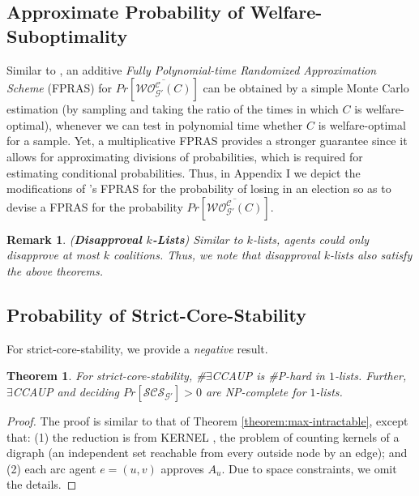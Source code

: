 \documentclass[letterpaper]{article}
\newtheorem{theorem}{Theorem}
\newtheorem{remark}{Remark}
\begin{document}
\subsection{Approximate Probability of Welfare-Suboptimality}
\label{sec:Probability of Welfare-Suboptimality}

Similar to \cite{imber2021probabilistic}, an additive \textit{Fully Polynomial-time Randomized Approximation Scheme} (FPRAS) \cite{karger1995randomized} for $Pr[\overline{\mathcal{WO}^{\mathcal{C}}_{\mathcal{G}'}(C)}]$ can be obtained by a simple Monte Carlo estimation (by sampling and taking the ratio of the times in which $C$ is welfare-optimal), whenever we can test in polynomial time whether $C$ is welfare-optimal for a sample. Yet, a multiplicative FPRAS provides a stronger guarantee since it allows for approximating divisions of probabilities, which is required for estimating conditional probabilities. Thus, in Appendix I we depict the modifications of \cite{imber2021probabilistic}'s FPRAS for the probability of losing in an election so as to devise a FPRAS for the probability $Pr[\overline{\mathcal{WO}^{\mathcal{C}}_{\mathcal{G}'}(C)}]$.


\begin{remark}
{\normalfont (\textbf{Disapproval $k$-Lists})} Similar to $k$-lists, agents could only {\normalfont disapprove} at most $k$ coalitions. Thus, we note that {\normalfont disapproval} $k$-lists also satisfy the above theorems.
\end{remark}

\subsection{Probability of Strict-Core-Stability}
\label{sec:Probability of Strict-Core-Stablity}
For strict-core-stability, we provide a \textit{negative} result.
\begin{theorem}
\label{theorem:strict-core-stable}
For strict-core-stability, \#$\exists$CCAUP is \#P-hard in $1$-lists. Further, $\exists$CCAUP and deciding $Pr[\mathcal{SCS}_{\mathcal{G}'}]>0$ are NP-complete for $1$-lists.
\end{theorem}
\begin{proof}
The proof is similar to that of Theorem \ref{theorem:max-intractable}, except that: (1) the reduction is from KERNEL \cite{szwarcfiter1994enumerating}, the problem of counting kernels of a digraph (an independent set reachable from every outside node by an edge); and (2) each arc agent $e = (u,v)$ approves $A_u$. Due to space constraints, we omit the details.
\end{proof}
\end{document}

